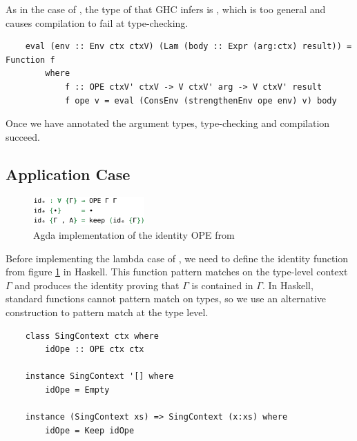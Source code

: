 As in the  case of , the type of  that GHC infers is , which is too general and causes compilation to fail at type-checking.

\begin{lstlisting}
    eval (env :: Env ctx ctxV) (Lam (body :: Expr (arg:ctx) result)) = Function f 
        where
            f :: OPE ctxV' ctxV -> V ctxV' arg -> V ctxV' result
            f ope v = eval (ConsEnv (strengthenEnv ope env) v) body
\end{lstlisting}

Once we have annotated the argument types, type-checking and compilation succeed.

\subsection{Application Case}
\label{subsect:typedEvalAppCase}

\begin{figure}[h]
    \centering
    \includegraphics[width=0.38\textwidth]{./images/agda_id_ope.png}
    \caption{Agda implementation of the identity OPE from \cite{AgdaNbe}}
    \label{fig:agdaIdOPE}
\end{figure}

Before implementing the lambda case of , we need to define the identity  function from figure \ref{fig:agdaIdOPE} in Haskell. This function pattern matches on the type-level context $\Gamma$ and produces the identity  proving that $\Gamma$ is contained in $\Gamma$. In Haskell, standard functions cannot pattern match on types, so we use an alternative construction to pattern match at the type level.



\begin{lstlisting}
    class SingContext ctx where
        idOpe :: OPE ctx ctx

    instance SingContext '[] where
        idOpe = Empty

    instance (SingContext xs) => SingContext (x:xs) where
        idOpe = Keep idOpe
\end{lstlisting}

